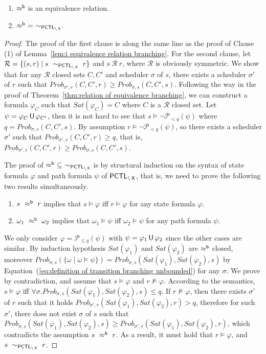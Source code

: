 \documentclass{LMCS}
\def\phi{\varphi}
\DeclareMathOperator{\U}{\text{\sf U}}
\DeclareMathOperator{\X}{\text{\sf X}}
\newcommand{\PCTL}{{\sf PCTL}}
\newcommand{\MC}[1]{\mathcal{#1}}
\newcommand{\EPCTLWN}{\sim_{\PCTL_{\backslash\X}}}
\newcommand{\WBSB}{\approx^{{\sf b}}}
\newcommand{\MEASURE}{\mathit{Prob}}
\begin{document}
\begin{thm}\label{thm:weak bisimulation and PCTL branching}\hfill
\begin{enumerate}[\em(1)]
\item $\WBSB$ is an equivalence relation.
\item $\WBSB~=~\EPCTLWN$.
\end{enumerate}
\end{thm}
\begin{proof}
The proof of the first clause is along the same line as the proof of
  Clause (1) of Lemma~\ref{lem:i equivalence relation branching}.
For the second clause, let $\MC{R}=\{(s,r)\mid s~\EPCTLWN~r\}$ and $s~\MC{R}~r$, where $\MC{R}$ is obviously symmetric. We show that for any $\MC{R}$ closed sets $C,C'$ and scheduler $\sigma$ of $s$, there exists a scheduler $\sigma'$ of $r$ such that $\MEASURE_{\sigma',r}(C,C',r)\geq\MEASURE_{\sigma,s}(C,C',s)$. Following the way in the proof of Theorem~\ref{thm:relation of equivalence branching}, we can construct a formula $\phi_C$ such that $\mathit{Sat}(\phi_C)=C$ where $C$ is a $\MC{R}$ closed set. Let $\psi=\phi_C\U\phi_{C'}$, then it is not hard to see that $s\models\neg \MC{P}_{<q}(\psi)$ where $q=\MEASURE_{\sigma,s}(C,C',s)$. By assumption $r\models\neg\MC{P}_{<q}(\psi)$, so there exists a scheduler $\sigma'$ such that $\MEASURE_{\sigma',r}(C,C',r)\geq q$, that is, $\MEASURE_{\sigma',r}(C,C',r)\geq\MEASURE_{\sigma,s}(C,C',s)$.

The proof of $\WBSB~\subseteq~\EPCTLWN$ is by structural induction on the syntax of state formula $\phi$ and path formula $\psi$ of $\PCTL_{\backslash\X}$, that is, we need to prove the following two results simultaneously.
\begin{enumerate}[(1)]
\item $s~\WBSB~r$ implies that $s\models\phi$ iff $r\models\phi$ for any state formula $\phi$.
\item $\omega_1~\WBSB~\omega_2$ implies that $\omega_1\models\psi$ iff $\omega_2\models\psi$ for any path formula $\psi$.
\end{enumerate}
We only consider $\phi=\MC{P}_{\leq q}(\psi)$ with
$\psi=\phi_1\U\phi_2$ since the other cases are similar.  By induction
hypothesis $\mathit{Sat}(\phi_1)$ and $\mathit{Sat}(\phi_2)$ are
$\WBSB$ closed, moreover
$\MEASURE_{\sigma,s}(\{\omega\mid\omega\models\psi\})=\MEASURE_{\sigma,s}(\mathit{Sat}(\phi_1),\mathit{Sat}(\phi_2),s)$
by Equation~(\ref{eq:definition of transition branching unbounded})
for any $\sigma$. We prove by contradiction, and assume that
$s\models\phi$ and $r\not\models\phi$. According to the semantics,
$s\models\phi$ iff
$\forall\sigma.\MEASURE_{\sigma,s}(\mathit{Sat}(\phi_1),\mathit{Sat}(\phi_2),s)\leq
q$. If $r\not\models\phi$, then there exists $\sigma'$ of $r$ such
that it holds
$\MEASURE_{\sigma',r}(\mathit{Sat}(\phi_1),\mathit{Sat}(\phi_2),r)>q$,
therefore for such $\sigma'$, there does not exist $\sigma$ of $s$
such that
$\MEASURE_{\sigma,s}(\mathit{Sat}(\phi_1),\mathit{Sat}(\phi_2),s)\geq
\MEASURE_{\sigma',r}(\mathit{Sat}(\phi_1),\mathit{Sat}(\phi_2),r)$,
which contradicts the assumption $s~\WBSB~r$. As a result, it must
hold that $r\models\phi$, and $s~\EPCTLWN~r$.
\end{proof}
\end{document}

